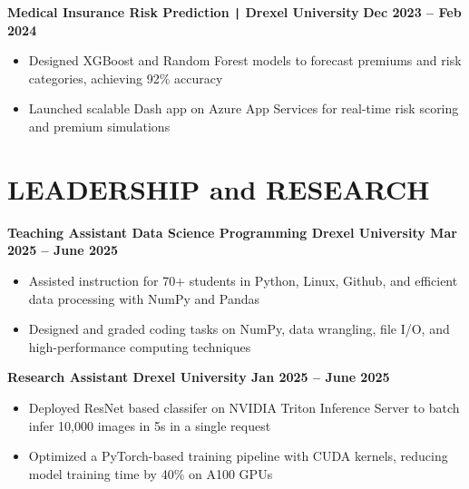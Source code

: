 \documentclass[10pt]{article}
\begin{document}
\noindent
\textbf{Medical Insurance Risk Prediction \texttt{|} Drexel University} \hfill \textbf{Dec 2023 -- Feb 2024} \\
\vspace{-0.4cm}
\begin{itemize}[leftmargin=0.6cm, itemsep=-0.1cm, topsep=0cm]

    \item Designed XGBoost and Random Forest models to forecast premiums and risk categories, achieving 92\% accuracy

    \item Launched scalable Dash app on Azure App Services for real-time risk scoring and premium simulations

\end{itemize}


\vspace{-0.4cm}
\section*{LEADERSHIP and RESEARCH}
\vspace{-0.1cm}

\noindent
\textbf{Teaching Assistant \textbar{} Data Science Programming \textbar{} Drexel University  \hfill Mar 2025 -- June 2025} \\
\vspace{-0.4cm}
\begin{itemize}[leftmargin=0.6cm, itemsep=-0.1cm, topsep=0cm]

    \item Assisted instruction for 70+ students in Python, Linux, Github, and efficient data processing with NumPy and Pandas

    \item Designed and graded coding tasks on  NumPy, data wrangling, file I/O, and high-performance computing techniques

\end{itemize}

\noindent
\textbf{Research Assistant \textbar{} Drexel University \hfill Jan 2025 -- June 2025} \\
\vspace{-0.4cm}
\begin{itemize}[leftmargin=0.6cm, itemsep=-0.1cm, topsep=0cm]

    \item Deployed ResNet based classifer on NVIDIA Triton Inference Server to batch infer 10,000 images in 5s in a single request

    \item Optimized a PyTorch-based training pipeline with CUDA kernels, reducing model training time by 40\% on A100 GPUs

\end{itemize}
\end{document}
